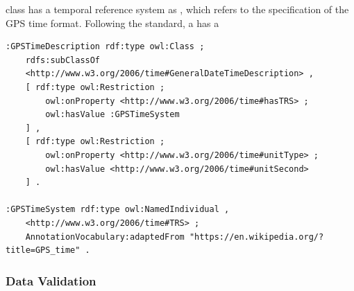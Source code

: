  class has a temporal reference system as , which refers to the specification of the GPS time format. Following the standard, a  has a 

\begin{verbatim}
:GPSTimeDescription rdf:type owl:Class ;
    rdfs:subClassOf 
    <http://www.w3.org/2006/time#GeneralDateTimeDescription> ,
    [ rdf:type owl:Restriction ;
        owl:onProperty <http://www.w3.org/2006/time#hasTRS> ;
        owl:hasValue :GPSTimeSystem
    ] ,
    [ rdf:type owl:Restriction ;
        owl:onProperty <http://www.w3.org/2006/time#unitType> ;
        owl:hasValue <http://www.w3.org/2006/time#unitSecond>
    ] .    

:GPSTimeSystem rdf:type owl:NamedIndividual ,
    <http://www.w3.org/2006/time#TRS> ;
    AnnotationVocabulary:adaptedFrom "https://en.wikipedia.org/?title=GPS_time" .
\end{verbatim}


\subsubsection*{Data Validation}

